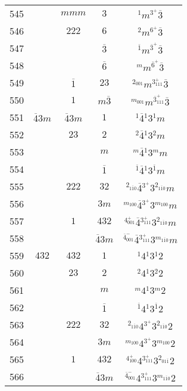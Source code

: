 \begin{longtable}{ccccc}
  545 &  & $mmm$ & $3$ & ${}^{1} m {}^{3^{+}} \overline{3} $\\
  546 &  & $222$ & $6$ & ${}^{2} m {}^{6^{+}} \overline{3} $\\
  547 &  &  & $\overline{3}$ & ${}^{\overline{1}} m {}^{\overline{3}^{+}} \overline{3} $\\
  548 &  &  & $\overline{6}$ & ${}^{m} m {}^{\overline{6}^{+}} \overline{3} $\\
  549 &  & $\overline{1}$ & $23$ & ${}^{2_{001}} m {}^{3^{+}_{111}} \overline{3} $\\
  550 &  & $1$ & $m\overline{3}$ & ${}^{m_{001}} m {}^{\overline{3}^{+}_{111}} \overline{3} $\\
  551 & $\overline{4}3m$ & $\overline{4}3m$ & $1$ & ${}^{1} \overline{4} {}^{1} 3 {}^{1} m $\\
  552 &  & $23$ & $2$ & ${}^{2} \overline{4} {}^{1} 3 {}^{2} m $\\
  553 &  &  & $m$ & ${}^{m} \overline{4} {}^{1} 3 {}^{m} m $\\
  554 &  &  & $\overline{1}$ & ${}^{\overline{1}} \overline{4} {}^{1} 3 {}^{\overline{1}} m $\\
  555 &  & $222$ & $32$ & ${}^{2_{1\overline{1}0}} \overline{4} {}^{3^{+}} 3 {}^{2_{1\overline{1}0}} m $\\
  556 &  &  & $3m$ & ${}^{m_{100}} \overline{4} {}^{3^{+}} 3 {}^{m_{100}} m $\\
  557 &  & $1$ & $432$ & ${}^{4^{+}_{001}} \overline{4} {}^{3^{+}_{111}} 3 {}^{2_{1\overline{1}0}} m $\\
  558 &  &  & $\overline{4}3m$ & ${}^{\overline{4}^{-}_{001}} \overline{4} {}^{3^{+}_{111}} 3 {}^{m_{1\overline{1}0}} m $\\
  559 & $432$ & $432$ & $1$ & ${}^{1} 4 {}^{1} 3 {}^{1} 2 $\\
  560 &  & $23$ & $2$ & ${}^{2} 4 {}^{1} 3 {}^{2} 2 $\\
  561 &  &  & $m$ & ${}^{m} 4 {}^{1} 3 {}^{m} 2 $\\
  562 &  &  & $\overline{1}$ & ${}^{\overline{1}} 4 {}^{1} 3 {}^{\overline{1}} 2 $\\
  563 &  & $222$ & $32$ & ${}^{2_{1\overline{1}0}} 4 {}^{3^{+}} 3 {}^{2_{1\overline{1}0}} 2 $\\
  564 &  &  & $3m$ & ${}^{m_{100}} 4 {}^{3^{+}} 3 {}^{m_{100}} 2 $\\
  565 &  & $1$ & $432$ & ${}^{4^{+}_{100}} 4 {}^{3^{+}_{111}} 3 {}^{2_{01\overline{1}}} 2 $\\
  566 &  &  & $\overline{4}3m$ & ${}^{\overline{4}^{-}_{001}} 4 {}^{3^{+}_{111}} 3 {}^{m_{1\overline{1}0}} 2 $\\

\end{longtable}
